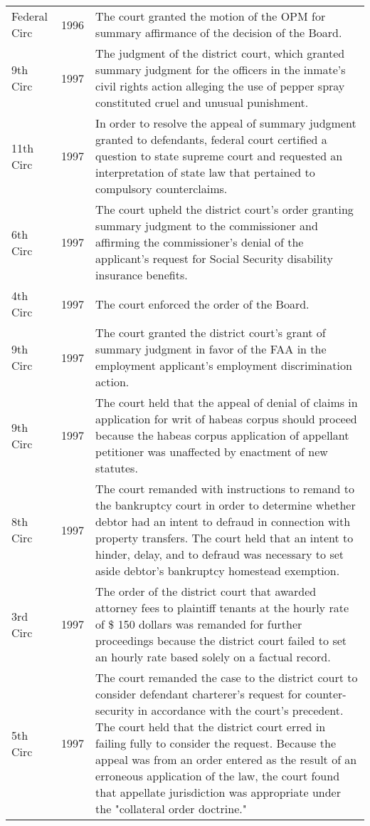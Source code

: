 \documentclass[10pt, letterpaper]{article}
\begin{document}
\begin{spacing}{1.0}
\begin{small}
\begin{longtable}[H]{llp{5in}}
    Federal Circ & 1996 & The court granted the motion of the OPM for summary affirmance of the decision of the Board.\\[4pt]
    9th Circ & 1997 & The judgment of the district court, which granted summary judgment for the officers in the inmate's civil rights action alleging the use of pepper spray constituted cruel and unusual punishment.\\[4pt]
    11th Circ & 1997 & In order to resolve the appeal of summary judgment granted to defendants, federal court certified a question to state supreme court and requested an interpretation of state law that pertained to compulsory counterclaims.\\[4pt]
    6th Circ & 1997 & The court upheld the district court's order granting summary judgment to the commissioner and affirming the commissioner's denial of the applicant's request for Social Security disability insurance benefits.\\[4pt]
    4th Circ & 1997 & The court enforced the order of the Board.\\[4pt]
    9th Circ & 1997 & The court granted the district court's grant of summary judgment in favor of the FAA in the employment applicant's employment discrimination action.\\[4pt]
    9th Circ & 1997 & The court held that the appeal of denial of claims in application for writ of habeas corpus should proceed because the habeas corpus application of appellant petitioner was unaffected by enactment of new statutes.\\[4pt]
    8th Circ & 1997 & The court remanded with instructions to remand to the bankruptcy court in order to determine whether debtor had an intent to defraud in connection with property transfers. The court held that an intent to hinder, delay, and to defraud was necessary to set aside debtor's bankruptcy homestead exemption.\\[4pt]
    3rd Circ & 1997 & The order of the district court that awarded attorney fees to plaintiff tenants at the hourly rate of \$ 150 dollars was remanded for further proceedings because the district court failed to set an hourly rate based solely on a factual record.\\[4pt]
    5th Circ & 1997 & The court remanded the case to the district court to consider defendant charterer's request for counter-security in accordance with the court's precedent. The court held that the district court erred in failing fully to consider the request. Because the appeal was from an order entered as the result of an erroneous application of the law, the court found that appellate jurisdiction was appropriate under the "collateral order doctrine."\\[4pt]

\end{longtable}
\end{small}
\end{spacing}
\end{document}
